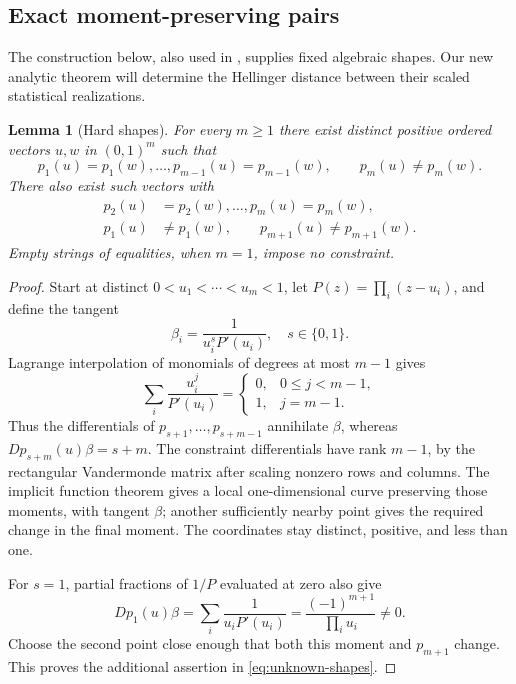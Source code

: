 \documentclass[11pt,a4paper]{article}
\numberwithin{equation}{section}
\newtheorem{lemma}[theorem]{Lemma}
\theoremstyle{definition}
\theoremstyle{remark}
\begin{document}
\subsection{Exact moment-preserving pairs}
The construction below, also used in \cite{companion}, supplies fixed
algebraic shapes. Our new analytic theorem will determine the Hellinger
distance between their scaled statistical realizations.

\begin{lemma}[Hard shapes]
\label{lem:hard-shapes}
For every $m\ge1$ there exist distinct positive ordered vectors $u,w$ in
$(0,1)^m$ such that
\begin{equation}
 p_1(u)=p_1(w),\ldots,p_{m-1}(u)=p_{m-1}(w),\qquad
 p_m(u)\ne p_m(w).
 \label{eq:known-shapes}
\end{equation}
There also exist such vectors with
\begin{equation}
 \begin{split}
 p_2(u)&=p_2(w),\ldots,p_m(u)=p_m(w),\\
 p_1(u)&\ne p_1(w),\qquad p_{m+1}(u)\ne p_{m+1}(w).
 \end{split}
 \label{eq:unknown-shapes}
\end{equation}
Empty strings of equalities, when $m=1$, impose no constraint.
\end{lemma}
\begin{proof}
Start at distinct $0<u_1<\cdots<u_m<1$, let
$P(z)=\prod_i(z-u_i)$, and define the tangent
\[
 \beta_i=\frac1{u_i^sP'(u_i)},\quad s\in\{0,1\}.
\]
Lagrange interpolation of monomials of degrees at most $m-1$ gives
\[
 \sum_i\frac{u_i^j}{P'(u_i)}=
 \begin{cases}0,&0\le j<m-1,\\1,&j=m-1.\end{cases}
\]
Thus the differentials of $p_{s+1},\ldots,p_{s+m-1}$ annihilate $\beta$,
whereas $Dp_{s+m}(u)\beta=s+m$. The constraint differentials have rank
$m-1$, by the rectangular Vandermonde matrix after scaling nonzero rows
and columns. The implicit function theorem gives a local one-dimensional
curve preserving those moments, with tangent $\beta$; another sufficiently
nearby point gives the required change in the final moment. The coordinates
stay distinct, positive, and less than one.

For $s=1$, partial fractions of $1/P$ evaluated at zero also give
\[
 Dp_1(u)\beta=\sum_i\frac1{u_iP'(u_i)}
 =\frac{(-1)^{m+1}}{\prod_i u_i}\ne0.
\]
Choose the second point close enough that both this moment and $p_{m+1}$
change. This proves the additional assertion in \eqref{eq:unknown-shapes}.
\end{proof}
\end{document}
